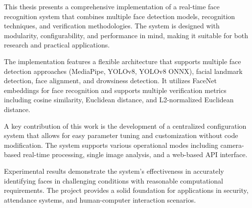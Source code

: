 This thesis presents a comprehensive implementation of a real-time face recognition system that combines multiple face detection models, recognition techniques, and verification methodologies. The system is designed with modularity, configurability, and performance in mind, making it suitable for both research and practical applications.

The implementation features a flexible architecture that supports multiple face detection approaches (MediaPipe, YOLOv8, YOLOv8 ONNX), facial landmark detection, face alignment, and drowsiness detection. It utilizes FaceNet embeddings for face recognition and supports multiple verification metrics including cosine similarity, Euclidean distance, and L2-normalized Euclidean distance.

A key contribution of this work is the development of a centralized configuration system that allows for easy parameter tuning and customization without code modification. The system supports various operational modes including camera-based real-time processing, single image analysis, and a web-based API interface.

Experimental results demonstrate the system's effectiveness in accurately identifying faces in challenging conditions with reasonable computational requirements. The project provides a solid foundation for applications in security, attendance systems, and human-computer interaction scenarios.